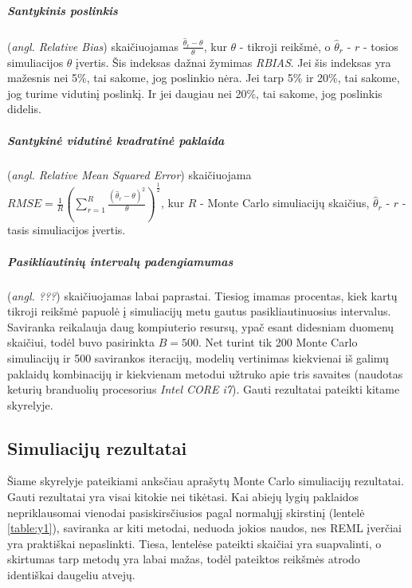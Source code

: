\documentclass[12pt,a4paper]{article}
\begin{document}
\subparagraph{Santykinis poslinkis} (\textit{angl. Relative Bias}) skaičiuojamas $\frac{\hat{\theta}_r-\theta}{\theta}$, kur $\theta$ - tikroji reikšmė, o $\hat{\theta}_r$ - $r$ - tosios simuliacijos $\theta$ įvertis. Šis indeksas dažnai žymimas \textit{RBIAS}. Jei šis indeksas yra mažesnis nei 5\%, tai sakome, jog poslinkio nėra. Jei tarp 5\% ir 20\%, tai sakome, jog turime vidutinį poslinkį. Ir jei daugiau nei 20\%, tai sakome, jog poslinkis didelis.

\subparagraph{Santykinė vidutinė kvadratinė paklaida} (\textit{angl. Relative Mean Squared Error}) skaičiuojama $RMSE=\frac{1}{R}\left(\sum^R_{r=1}\frac{(\hat{\theta}_r-\theta)^2}{\theta}\right)^\frac{1}{2}$, kur $R$ - Monte Carlo simuliacijų skaičius, $\hat{\theta}_r$ - $r$ - tasis simuliacijos įvertis.

\subparagraph{Pasikliautinių intervalų padengiamumas} (\textit{angl. ???}) skaičiuojamas labai paprastai. Tiesiog imamas procentas, kiek kartų tikroji reikšmė papuolė į simuliacijų metu gautus pasikliautinuosius intervalus.\\

\indent Saviranka reikalauja daug kompiuterio resursų, ypač esant didesniam duomenų skaičiui, todėl buvo pasirinkta $B=500$. Net turint tik 200 Monte Carlo simuliacijų ir 500 savirankos iteracijų, modelių vertinimas kiekvienai iš galimų paklaidų kombinacijų ir kiekvienam metodui užtruko apie tris savaites (naudotas keturių branduolių procesorius \textit{Intel CORE i7}). Gauti rezultatai pateikti kitame skyrelyje.

\subsection{Simuliacijų rezultatai}
\indent Šiame skyrelyje pateikiami anksčiau aprašytų Monte Carlo simuliacijų rezultatai. Gauti rezultatai yra visai kitokie nei tikėtasi. Kai abiejų lygių paklaidos nepriklausomai vienodai pasiskirsčiusios pagal normalųjį skirstinį (lentelė \ref{table:y1}), saviranka ar kiti metodai, neduoda jokios naudos, nes REML įverčiai yra praktiškai nepaslinkti. Tiesa, lentelėse pateikti skaičiai yra suapvalinti, o skirtumas tarp metodų yra labai mažas, todėl pateiktos reikšmės atrodo identiškai daugeliu atvejų.
\end{document}

